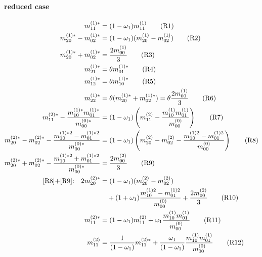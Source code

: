\documentclass{article}
\begin{document}
  \paragraph{reduced case}
  \begin{align}
    m_{11}^{(1)*} & = (1-\omega_1) m_{11}^{(1)}\label{R1}\tag{R1} \\
    m_{20}^{(1)*} - m_{02}^{(1)*}
      & = (1-\omega_1) (m_{20}^{(1)} - m_{02}^{(1)})\label{R2}\tag{R2} \\
    m_{20}^{(1)*} + m_{02}^{(1)*}
      & =  \frac{2 m_{00}^{(1)}}{3}\label{R3}\tag{R3} \\
    m_{21}^{(1)*} & = \theta m_{01}^{(1)*}\label{R4}\tag{R4} \\
    m_{12}^{(1)*} & = \theta m_{10}^{(1)*}\label{R5}\tag{R5} \\
    m_{22}^{(1)*} & = \theta (m_{20}^{(1)*} + m_{02}^{(1)*}) = \theta \frac{2 m_{00}^{(1)}}{3}\label{R6}\tag{R6} \\
    m_{11}^{(2)*} - \frac{ m_{10}^{(1)*}m_{01}^{(1)*}}{m_{00}^{(0)*}}
    & = (1-\omega_1)\left(m_{11}^{(2)} - \frac{ m_{10}^{(1)}m_{01}^{(1)}}{m_{00}^{(0)}}\right)\label{R7}\tag{R7} \\
    m_{20}^{(2)*}-m_{02}^{(2)*} - \frac{ m_{10}^{(1)*2} - m_{01}^{(1)*2}}{m_{00}^{(0)*}}
    & = (1-\omega_1) \left(m_{20}^{(2)}-m_{02}^{(2)} - \frac{ m_{10}^{(1)2} - m_{01}^{(1)2}}{m_{00}^{(0)}}\right)\label{R8}\tag{R8} \\
    m_{20}^{(2)*}+m_{02}^{(2)*} - \frac{ m_{10}^{(1)*2} + m_{01}^{(1)*2}}{m_{00}^{(0)*}}
    & = \frac{2 m_{00}^{(2)}}{3} \label{R9}\tag{R9} \\
    \text{\eqref{R8}+\eqref{R9}:}\quad2m_{20}^{(2)*}
    & = (1-\omega_1) (m_{20}^{(2)}-m_{02}^{(2)})\nonumber \\
    &\quad+ (1+\omega_1)\frac{ m_{10}^{(1)2} - m_{01}^{(1)2}}{m_{00}^{(0)}} + \frac{2 m_{00}^{(2)}}{3}\label{R10}\tag{R10} \\
    m_{11}^{(2)*}
    & = (1-\omega_1)m_{11}^{(2)} + \omega_1 \frac{ m_{10}^{(1)}m_{01}^{(1)}}{m_{00}^{(0)}}\label{R11}\tag{R11} \\
    m_{11}^{(2)}
    & = \frac{1}{(1-\omega_1)}m_{11}^{(2)*} + \frac{\omega_1}{(1-\omega_1)} \frac{ m_{10}^{(1)}m_{01}^{(1)}}{m_{00}^{(0)}}\label{R12}\tag{R12}
  \end{align}
\end{document}
